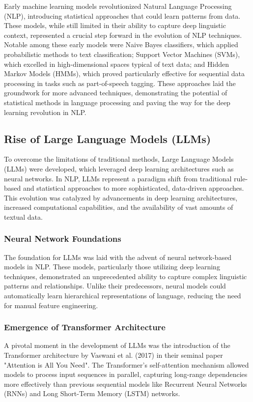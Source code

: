 Early machine learning models revolutionized Natural Language Processing (NLP), introducing statistical approaches that could learn patterns from data. These models, while still limited in their ability to capture deep linguistic context, represented a crucial step forward in the evolution of NLP techniques. Notable among these early models were Naive Bayes classifiers, which applied probabilistic methods to text classification; Support Vector Machines (SVMs), which excelled in high-dimensional spaces typical of text data; and Hidden Markov Models (HMMs), which proved particularly effective for sequential data processing in tasks such as part-of-speech tagging. These approaches laid the groundwork for more advanced techniques, demonstrating the potential of statistical methods in language processing and paving the way for the deep learning revolution in NLP.

\subsection{Rise of Large Language Models (LLMs)}
To overcome the limitations of traditional methods, Large Language Models (LLMs) were developed, which leveraged deep learning architectures such as neural networks. In NLP, LLMs represent a paradigm shift from traditional rule-based and statistical approaches to more sophisticated, data-driven approaches. This evolution was catalyzed by advancements in deep learning architectures, increased computational capabilities, and the availability of vast amounts of textual data.

\subsubsection{Neural Network Foundations}
The foundation for LLMs was laid with the advent of neural network-based models in NLP. These models, particularly those utilizing deep learning techniques, demonstrated an unprecedented ability to capture complex linguistic patterns and relationships. Unlike their predecessors, neural models could automatically learn hierarchical representations of language, reducing the need for manual feature engineering.

\subsubsection{Emergence of Transformer Architecture}
A pivotal moment in the development of LLMs was the introduction of the Transformer architecture by Vaswani et al. (2017) in their seminal paper "Attention is All You Need". The Transformer's self-attention mechanism allowed models to process input sequences in parallel, capturing long-range dependencies more effectively than previous sequential models like Recurrent Neural Networks (RNNs) and Long Short-Term Memory (LSTM) networks.

